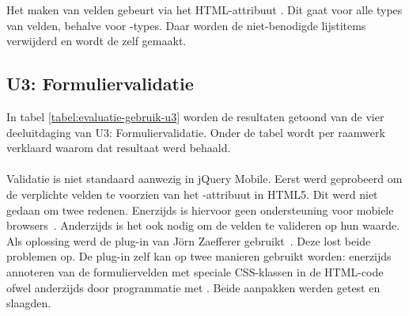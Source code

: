 Het  maken van velden gebeurt via het HTML-attribuut .
Dit gaat voor alle types van velden, behalve voor -types.
Daar worden de niet-benodigde lijstitems verwijderd en wordt de  zelf  gemaakt.


\subsection{U3: Formuliervalidatie}
\label{sec:evaluatie-gebruik-u3}

In tabel \ref{tabel:evaluatie-gebruik-u3} worden de resultaten getoond van de vier deeluitdaging van U3: Formuliervalidatie.
Onder de tabel wordt per raamwerk verklaard waarom dat resultaat werd behaald.


\begin{table}[H]
\centering
{}
\caption{Gebruik voor U3: Formuliervalidatie}
\label{tabel:evaluatie-gebruik-u3}
\end{table}

\paragraph{\jqm}
Validatie is niet standaard aanwezig in jQuery Mobile. 
Eerst werd geprobeerd om de verplichte velden te voorzien van het -attribuut in HTML5. 
Dit werd niet gedaan om twee redenen.
Enerzijds is hiervoor geen ondersteuning voor mobiele browsers~\cite{Deveria2013}. 
Anderzijds is het ook nodig om de velden te valideren op hun waarde.
Als oplossing werd de plug-in van Jörn Zaefferer gebruikt~\cite{Zaefferer2013}. 
Deze lost beide problemen op.
De plug-in zelf kan op twee manieren gebruikt worden: enerzijds annoteren van de formuliervelden met speciale CSS-klassen in de HTML-code ofwel anderzijds door programmatie met \js{}. 
Beide aanpakken werden getest en slaagden. 

